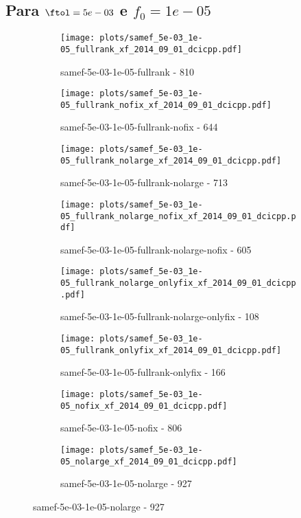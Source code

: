 \newpage
\subsection{Para $\ftol = 5e-03$ e $f_0 = 1e-05$}

\begin{figure}[H]
  \centering
  \begin{subfigure}{0.48\textwidth}
    \texttt{[image: plots/samef\_5e-03\_1e-05\_fullrank\_xf\_2014\_09\_01\_dcicpp.pdf]}
    \caption{samef-5e-03-1e-05-fullrank - 810}
  \end{subfigure}
  \begin{subfigure}{0.48\textwidth}
    \texttt{[image: plots/samef\_5e-03\_1e-05\_fullrank\_nofix\_xf\_2014\_09\_01\_dcicpp.pdf]}
    \caption{samef-5e-03-1e-05-fullrank-nofix - 644}
  \end{subfigure}
  \begin{subfigure}{0.48\textwidth}
    \texttt{[image: plots/samef\_5e-03\_1e-05\_fullrank\_nolarge\_xf\_2014\_09\_01\_dcicpp.pdf]}
    \caption{samef-5e-03-1e-05-fullrank-nolarge - 713}
  \end{subfigure}
  \begin{subfigure}{0.48\textwidth}
    \texttt{[image: plots/samef\_5e-03\_1e-05\_fullrank\_nolarge\_nofix\_xf\_2014\_09\_01\_dcicpp.pdf]}
    \caption{samef-5e-03-1e-05-fullrank-nolarge-nofix - 605}
  \end{subfigure}
  \begin{subfigure}{0.48\textwidth}
    \texttt{[image: plots/samef\_5e-03\_1e-05\_fullrank\_nolarge\_onlyfix\_xf\_2014\_09\_01\_dcicpp.pdf]}
    \caption{samef-5e-03-1e-05-fullrank-nolarge-onlyfix - 108}
  \end{subfigure}
  \begin{subfigure}{0.48\textwidth}
    \texttt{[image: plots/samef\_5e-03\_1e-05\_fullrank\_onlyfix\_xf\_2014\_09\_01\_dcicpp.pdf]}
    \caption{samef-5e-03-1e-05-fullrank-onlyfix - 166}
  \end{subfigure}
  \begin{subfigure}{0.48\textwidth}
    \texttt{[image: plots/samef\_5e-03\_1e-05\_nofix\_xf\_2014\_09\_01\_dcicpp.pdf]}
    \caption{samef-5e-03-1e-05-nofix - 806}
  \end{subfigure}
  \begin{subfigure}{0.48\textwidth}
    \texttt{[image: plots/samef\_5e-03\_1e-05\_nolarge\_xf\_2014\_09\_01\_dcicpp.pdf]}
    \caption{samef-5e-03-1e-05-nolarge - 927}

\end{subfigure}
\end{figure}
